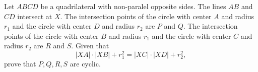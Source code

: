 Let $ABCD$ be a quadrilateral with non-paralel opposite sides. The lines $AB$ and $CD$ intersect at $X$. 
The intersection points of the circle with center $A$ and radius $r_1$ and the circle with center $D$ and radius $r_2$ are $P$ and $Q$. The intersection points of the circle with center $B$ and radius $r_1$ and the circle with center $C$ and radius $r_2$ are $R$ and $S$. Given that \[ |XA| \cdot |XB| + r_1^2 = |XC| \cdot |XD| + r_2^2,\] prove that $P,Q,R,S$ are cyclic.
